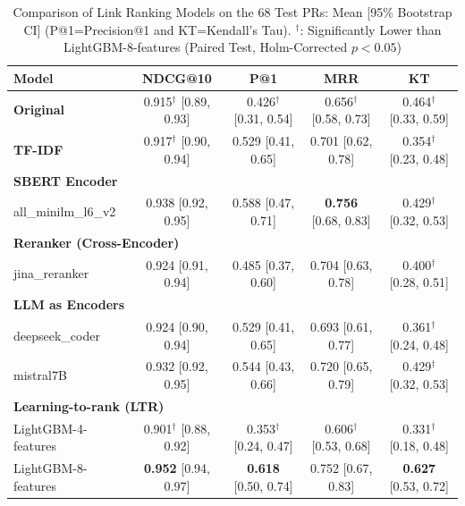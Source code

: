 \begin{table}[t]
\centering
\caption{Comparison of Link Ranking Models on the 68 Test PRs: Mean [95\% Bootstrap CI] (P@1=Precision@1 and KT=Kendall's Tau). $^\dagger$: Significantly Lower than LightGBM-8-features (Paired Test, Holm-Corrected $p<0.05$)}
\label{tab:autoeval}
\small
\begin{tabular}{lcccc}
\toprule
\textbf{Model} & \textbf{NDCG@10} & \textbf{P@1} & \textbf{MRR} & \textbf{KT} \\
\midrule
\textbf{Original} & 0.915$^\dagger$ {\footnotesize[0.89, 0.93]} & 0.426$^\dagger$ {\footnotesize[0.31, 0.54]} & 0.656$^\dagger$ {\footnotesize[0.58, 0.73]} & 0.464$^\dagger$ {\footnotesize[0.33, 0.59]} \\
\midrule
\textbf{TF-IDF} & 0.917$^\dagger$ {\footnotesize[0.90, 0.94]} & 0.529 {\footnotesize[0.41, 0.65]} & 0.701 {\footnotesize[0.62, 0.78]} & 0.354$^\dagger$ {\footnotesize[0.23, 0.48]} \\
\midrule
\multicolumn{5}{l}{\textbf{SBERT Encoder}} \\
all\_minilm\_l6\_v2 & 0.938 {\footnotesize[0.92, 0.95]} & 0.588 {\footnotesize[0.47, 0.71]} & \textbf{0.756} {\footnotesize[0.68, 0.83]} & 0.429$^\dagger$ {\footnotesize[0.32, 0.53]} \\
\midrule
\multicolumn{5}{l}{\textbf{Reranker (Cross-Encoder)}} \\
jina\_reranker & 0.924 {\footnotesize[0.91, 0.94]} & 0.485 {\footnotesize[0.37, 0.60]} & 0.704 {\footnotesize[0.63, 0.78]} & 0.400$^\dagger$ {\footnotesize[0.28, 0.51]} \\
\midrule
\multicolumn{5}{l}{\textbf{LLM as Encoders}} \\
deepseek\_coder & 0.924 {\footnotesize[0.90, 0.94]} & 0.529 {\footnotesize[0.41, 0.65]} & 0.693 {\footnotesize[0.61, 0.77]} & 0.361$^\dagger$ {\footnotesize[0.24, 0.48]} \\
mistral7B & 0.932 {\footnotesize[0.92, 0.95]} & 0.544 {\footnotesize[0.43, 0.66]} & 0.720 {\footnotesize[0.65, 0.79]} & 0.429$^\dagger$ {\footnotesize[0.32, 0.53]} \\
\midrule
\multicolumn{5}{l}{\textbf{Learning-to-rank (LTR)}} \\
LightGBM-4-features & 0.901$^\dagger$ {\footnotesize[0.88, 0.92]} & 0.353$^\dagger$ {\footnotesize[0.24, 0.47]} & 0.606$^\dagger$ {\footnotesize[0.53, 0.68]} & 0.331$^\dagger$ {\footnotesize[0.18, 0.48]} \\
LightGBM-8-features & \textbf{0.952} {\footnotesize[0.94, 0.97]} & \textbf{0.618} {\footnotesize[0.50, 0.74]} & 0.752 {\footnotesize[0.67, 0.83]} & \textbf{0.627} {\footnotesize[0.53, 0.72]} \\
\bottomrule
\end{tabular}
\end{table}
